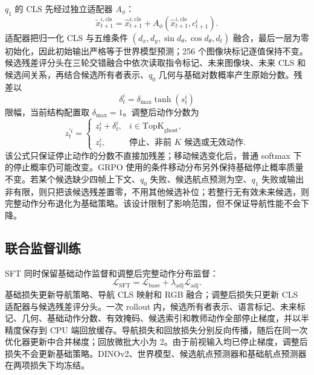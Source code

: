 \documentclass[UTF8,11pt]{ctexart}
\begin{document}
$q_1$ 的 CLS 先经过独立适配器 $A_{\phi}$：
\begin{equation}
\widetilde{x}_{t+1}^{i,\mathrm{cls}}
=\widehat{x}_{t+1}^{i,\mathrm{cls}}
+A_{\phi}(\widehat{x}_{t+1}^{i,\mathrm{cls}},c_{t+1}^{i}).
\end{equation}
适配器把归一化 CLS 与五维条件 $(d_x,d_y,\sin d_\theta,\cos d_\theta,d_t)$ 融合，最后一层为零初始化，因此初始输出严格等于世界模型预测；256 个图像块标记逐值保持不变。候选残差评分头在三轮交错融合中依次读取指令标记、未来图像块、未来 CLS 和候选间关系，再结合候选所有者表示、$q_0$ 几何与基础对数概率产生原始分数。残差以
\begin{equation}
\delta_t^i=\delta_{\max}\tanh(s_t^i)
\end{equation}
限幅，当前结构配置取 $\delta_{\max}=1$。调整后动作分数为
\begin{equation}
z_t^{\prime i}=
\begin{cases}
z_t^i+\delta_t^i, & i\in\mathrm{TopK}_{\mathrm{ghost}},\\
z_t^i, & \text{停止、非前 $K$ 候选或无效动作}.
\end{cases}
\end{equation}
该公式只保证停止动作的分数不直接加残差；移动候选变化后，普通 softmax 下的停止概率仍可能改变。GRPO 使用的条件移动分布另外保持基础停止概率质量不变。若某个候选缺少四帧上下文、$q_0$ 失败、候选航点预测为空、$q_1$ 失败或输出非有限，则只把该候选残差置零，不用其他候选补位；若整行无有效未来候选，则完整动作分布退化为基础策略。该设计限制了影响范围，但不保证导航性能不会下降。

\subsection{联合监督训练}

SFT 同时保留基础动作监督和调整后完整动作分布监督：
\begin{equation}
\mathcal{L}_{\mathrm{SFT}}
=\mathcal{L}_{\mathrm{base}}
+\lambda_{\mathrm{adj}}\mathcal{L}_{\mathrm{adj}}.
\end{equation}
基础损失更新导航策略、导航 CLS 映射和 RGB 融合；调整后损失只更新 CLS 适配器与候选残差评分头。一次 rollout 内，候选所有者表示、语言标记、未来标记、几何、基础动作分数、有效掩码、候选索引和教师动作全部停止梯度，并以半精度保存到 CPU 端回放缓存。导航损失和回放损失分别反向传播，随后在同一次优化器更新中合并梯度；回放微批大小为 2。由于前视输入均已停止梯度，调整后损失不会更新基础策略。DINOv2、世界模型、候选航点预测器和基础航点预测器在两项损失下均冻结。
\end{document}
